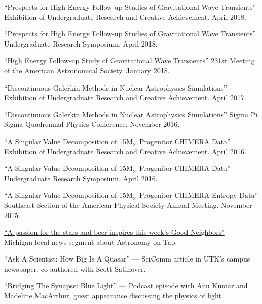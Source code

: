\documentclass[11pt]{vitae}
\begin{document}
\begin{publist}
  \item ``Prospects for High Energy Follow-up Studies of Gravitational Wave Transients'' Exhibition of Undergraduate Research and Creative Achievement. April 2018.
  \item ``Prospects for High Energy Follow-up Studies of Gravitational Wave Transients'' Undergraduate Research Symposium. April 2018.
  \item ``High Energy Follow-up Study of Gravitational Wave Transients'' 231st Meeting of the American Astronomical Society. January 2018.
  \item ``Discontinuous Galerkin Methods in Nuclear Astrophysics Simulations'' Exhibition of Undergraduate Research and Creative Achievement. April 2017.
  \item ``Discontinuous Galerkin Methods in Nuclear Astrophysics Simulations'' Sigma Pi Sigma Quadrennial Physics Conference. November 2016.
  \item ``A Singular Value Decomposition of 15M$_{\odot}$ Progenitor CHIMERA Data'' Exhibition of Undergraduate Research and Creative Achievement. April 2016.
  \item ``A Singular Value Decomposition of 15M$_{\odot}$ Progenitor CHIMERA Data'' Undergraduate Research Symposium. April 2016.
  \item ``A Singular Value Decomposition of 15M$_{\odot}$ Progenitor CHIMERA Entropy Data'' Southeast Section of the American Physical Society Annual Meeting. November 2015.

\end{publist}

\begin{genericlist}
\item[] \href{https://www.fox47news.com/neighborhoods/good-neighbors/a-passion-for-the-stars-and-beer-inspires-this-weeks-good-neighbors}{``A passion for the stars and beer inspires this week's Good Neighbors''} --- Michigan local news segment about Astronomy on Tap.
\item[] ``Ask A Scientist: How Big Is A Quasar'' --- SciComm article in UTK’s campus newspaper, co-authored with Scott Satinover. 
\item[] ``Bridging The Synapse: Blue Light'' --- Podcast episode with Anu Kumar and Madeline MacArthur, guest appearance discussing the physics of light.
\end{genericlist}
\end{document}
